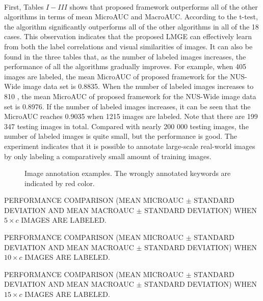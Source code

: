 \documentclass[a4paper,11pt]{report}
\begin{document}
\paragraph{}
First,  Tables $ I - III $  shows that proposed framework  outperforms all of the other algorithms in
terms of mean MicroAUC and MacroAUC. According to the
t-test, the algorithm significantly outperforms all of the other
algorithms in all of the 18 cases. This observation indicates that
the proposed LMGE can effectively learn from both the label
correlations and visual similarities of images.
It can also be found in the three tables that, as the number
of labeled images increases, the performance of all the algorithms
gradually improves. For example, when 405 images
are labeled, the mean MicroAUC of proposed framework for the NUS-Wide image data set is 0.8835. When the number of labeled
images increases to 810 , the mean MicroAUC
of proposed  framework for the NUS-Wide image data set is 0.8976.
If  the number of labeled images increases, it
can be seen that the MicroAUC reaches 0.9035 when 1215
images are labeled. Note that there are 199 347 testing images
in total. Compared with nearly 200 000 testing images, the
number of labeled images is quite small, but the performance
is good. The experiment indicates that it is possible to annotate
large-scale real-world images by only labeling a comparatively
small amount of training images.
\begin{figure} [ht]
 \centering
\caption{Image annotation examples. The wrongly annotated keywords are indicated by red color.}
\end{figure}
\begin{table}[H]
\centering
\tiny\caption{PERFORMANCE COMPARISON (MEAN MICROAUC $\pm$ STANDARD DEVIATION AND MEAN MACROAUC $\pm$ STANDARD DEVIATION) WHEN $5\times c$ IMAGES ARE
LABELED. }
\end{table}

\begin{table}[H]
\centering
\tiny\caption{PERFORMANCE COMPARISON (MEAN MICROAUC $\pm$ STANDARD DEVIATION AND MEAN MACROAUC $\pm$ STANDARD DEVIATION) WHEN $10\times c$ IMAGES ARE
LABELED. }
\end{table}
\begin{table}[H]
\centering
\tiny\caption{PERFORMANCE COMPARISON (MEAN MICROAUC $\pm$ STANDARD DEVIATION AND MEAN MACROAUC $\pm$ STANDARD DEVIATION) WHEN $15\times c$ IMAGES ARE
LABELED. }
\end{table}
\end{document}
